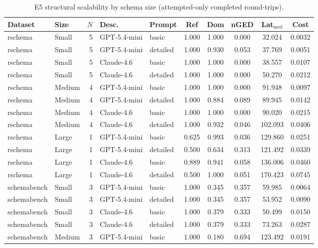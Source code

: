 \begin{table}[t]
\centering
\caption{E5 structural scalability by schema size (attempted-only completed round-trips).}
\label{tab:e5_scalability}
\footnotesize
\begin{tabular}{@{}l l r l l ccc cc@{}}
\toprule
Dataset & Size & $N$ & Desc. & Prompt & Ref & Dom & nGED & Lat$_\mathrm{med}$ & Cost \\
\midrule
rschema & Small & 5 & GPT-5.4-mini & basic & 1.000 & 1.000 & 0.000 & 32.024 & 0.0032 \\
rschema & Small & 5 & GPT-5.4-mini & detailed & 1.000 & 0.930 & 0.053 & 37.769 & 0.0051 \\
rschema & Small & 5 & Claude-4.6 & basic & 1.000 & 1.000 & 0.000 & 38.557 & 0.0107 \\
rschema & Small & 5 & Claude-4.6 & detailed & 1.000 & 1.000 & 0.000 & 50.270 & 0.0212 \\
rschema & Medium & 4 & GPT-5.4-mini & basic & 1.000 & 1.000 & 0.000 & 91.948 & 0.0097 \\
rschema & Medium & 4 & GPT-5.4-mini & detailed & 1.000 & 0.884 & 0.089 & 89.945 & 0.0142 \\
rschema & Medium & 4 & Claude-4.6 & basic & 1.000 & 1.000 & 0.000 & 90.020 & 0.0215 \\
rschema & Medium & 4 & Claude-4.6 & detailed & 1.000 & 0.932 & 0.046 & 102.093 & 0.0406 \\
rschema & Large & 1 & GPT-5.4-mini & basic & 0.625 & 0.993 & 0.036 & 129.860 & 0.0251 \\
rschema & Large & 1 & GPT-5.4-mini & detailed & 0.500 & 0.634 & 0.313 & 121.492 & 0.0339 \\
rschema & Large & 1 & Claude-4.6 & basic & 0.889 & 0.941 & 0.058 & 136.006 & 0.0460 \\
rschema & Large & 1 & Claude-4.6 & detailed & 0.500 & 1.000 & 0.051 & 170.423 & 0.0745 \\
schemabench & Small & 3 & GPT-5.4-mini & basic & 1.000 & 0.345 & 0.357 & 59.985 & 0.0064 \\
schemabench & Small & 3 & GPT-5.4-mini & detailed & 1.000 & 0.345 & 0.357 & 53.952 & 0.0090 \\
schemabench & Small & 3 & Claude-4.6 & basic & 1.000 & 0.379 & 0.333 & 50.499 & 0.0150 \\
schemabench & Small & 3 & Claude-4.6 & detailed & 1.000 & 0.379 & 0.333 & 73.263 & 0.0287 \\
schemabench & Medium & 3 & GPT-5.4-mini & basic & 1.000 & 0.180 & 0.694 & 123.492 & 0.0191 \\

\end{tabular}
\end{table}
